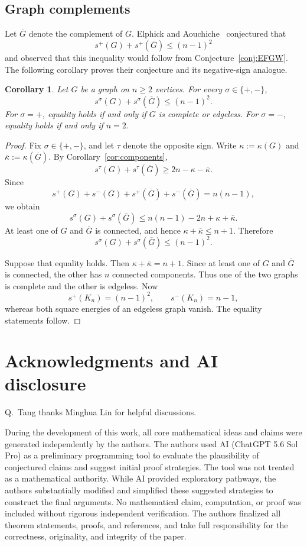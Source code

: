 \documentclass[11pt,letterpaper,reqno]{amsart}
\newtheorem{corollary}[theorem]{Corollary}
\theoremstyle{definition}
\begin{document}
\subsection{Graph complements}

Let $\overline G$ denote the complement of $G$.  Elphick and
Aouchiche~\cite[Conjecture~6]{EA} conjectured that
\[
    s^+(G)+s^+(\overline G)\le(n-1)^2
\]
and observed that this inequality would follow from
Conjecture~\ref{conj:EFGW}.  The following corollary proves their conjecture
and its negative-sign analogue.

\begin{corollary}\label{cor:nordhaus-gaddum}
Let $G$ be a graph on $n\ge2$ vertices.  For every
$\sigma\in\{+,-\}$,
\[
    s^\sigma(G)+s^\sigma(\overline G)\le(n-1)^2.
\]
For $\sigma=+$, equality holds if and only if $G$ is complete or edgeless.
For $\sigma=-$, equality holds if and only if $n=2$.
\end{corollary}

\begin{proof}
Fix $\sigma\in\{+,-\}$, and let $\tau$ denote the opposite sign.  Write $\kappa:=\kappa(G)$ and $\overline\kappa:=\kappa(\overline G)$. By Corollary~\ref{cor:components},
\[
    s^\tau(G)+s^\tau(\overline G)
    \ge 2n-\kappa-\overline\kappa.
\]
Since
\[
    s^+(G)+s^-(G)+s^+(\overline G)+s^-(\overline G)
    =n(n-1),
\]
we obtain
\[
    s^\sigma(G)+s^\sigma(\overline G)
    \le n(n-1)-2n+\kappa+\overline\kappa.
\]
At least one of $G$ and $\overline G$ is connected, and hence $\kappa+\overline\kappa\le n+1$. Therefore
\[
    s^\sigma(G)+s^\sigma(\overline G)\le(n-1)^2.
\]

Suppose that equality holds. Then $\kappa+\overline\kappa=n+1$. Since at least one of $G$ and $\overline G$ is connected, the other has
$n$ connected components.  Thus one of the two graphs is complete and the
other is edgeless.  Now
\[
    s^+(K_n)=(n-1)^2,
    \qquad
    s^-(K_n)=n-1,
\]
whereas both square energies of an edgeless graph vanish.  The equality
statements follow.
\end{proof}






\section*{Acknowledgments and AI disclosure}
Q.~Tang thanks Minghua Lin for helpful discussions.


During the development of this work, all core mathematical ideas and claims were generated independently by the authors. The authors used AI (ChatGPT 5.6 Sol Pro) as a preliminary programming tool to evaluate the plausibility of conjectured claims and suggest initial proof strategies. The tool was not treated as a mathematical authority. While AI provided exploratory pathways, the authors substantially modified and simplified these suggested strategies to construct the final arguments. No mathematical claim, computation, or proof was included without rigorous independent verification. The authors finalized all theorem statements, proofs, and references, and take full responsibility for the correctness, originality, and integrity of the paper.
\end{document}
